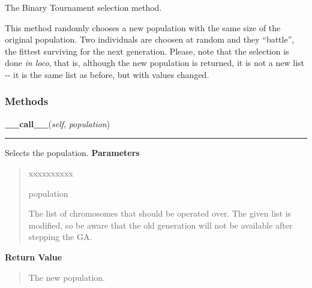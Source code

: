 The Binary Tournament selection method.

This method randomly chooses a new population with the same size of the
original population. Two individuals are choosen at random and they
``battle'', the fittest surviving for the next generation. Please, note that
the selection is done \emph{in loco}, that is, although the new population is
returned, it is not a new list -{}- it is the same list as before, but with
values changed.


  \subsubsection{Methods}

    \label{peach:ga:selection:BinaryTournament:__call__}

    \vspace{0.5ex}

\hspace{.8\funcindent}\begin{boxedminipage}{\funcwidth}

    \raggedright \textbf{\_\_call\_\_}(\textit{self}, \textit{population})

    \vspace{-1.5ex}

    \rule{\textwidth}{0.5\fboxrule}
\setlength{\parskip}{2ex}

Selects the population.
\setlength{\parskip}{1ex}
      \textbf{Parameters}
      \vspace{-1ex}

      \begin{quote}
        \begin{Ventry}{xxxxxxxxxx}

          \item[population]


The list of chromosomes that should be operated over. The given list
is modified, so be aware that the old generation will not be
available after stepping the GA.
        \end{Ventry}

      \end{quote}

      \textbf{Return Value}
    \vspace{-1ex}

      \begin{quote}

The new population.
      \end{quote}

    \end{boxedminipage}


